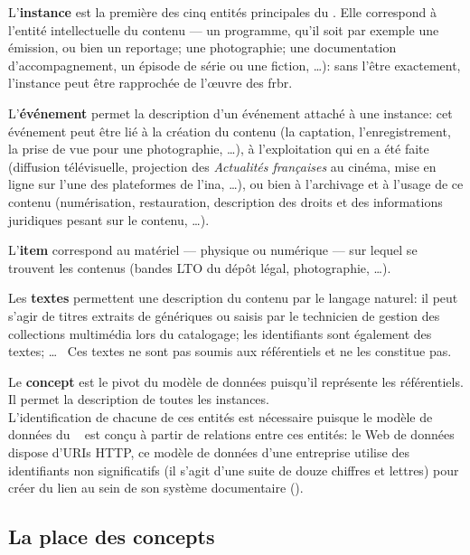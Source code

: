 \noindent L'\textbf{instance} est la première des cinq entités principales du \ldd. Elle correspond à l'entité intellectuelle du contenu --- un programme, qu'il soit par exemple une émission, ou bien un reportage; une photographie; une documentation d'accompagnement, un épisode de série ou une fiction, \dots): sans l'être exactement, l'instance peut être rapprochée de l'œuvre des \ac{frbr}.


\noindent L'\textbf{événement} permet la description d'un événement attaché à une instance: cet événement peut être lié à la création du contenu (la captation, l'enregistrement, la prise de vue pour une photographie, \dots), à l'exploitation qui en a été faite (diffusion télévisuelle, projection des \textit{Actualités françaises} au cinéma, mise en ligne sur l'une des plateformes de l'\ac{ina}, \dots), ou bien à l'archivage et à l'usage de ce contenu (numérisation, restauration, description des droits et des informations juridiques pesant sur le contenu, \dots).

\noindent L'\textbf{item} correspond au matériel --- physique ou numérique --- sur lequel se trouvent les contenus (bandes LTO du dépôt légal, photographie, \dots).

\noindent Les \textbf{textes} permettent une description du contenu par le langage naturel: il peut s'agir de titres extraits de génériques ou saisis par le technicien de gestion des collections multimédia lors du catalogage; les identifiants sont également des textes; \dots ~ Ces textes ne sont pas soumis aux référentiels et ne les constitue pas.

\noindent Le \textbf{concept} est le pivot du modèle de données puisqu'il représente les référentiels. Il permet la description de toutes les instances.\\

L'identification de chacune de ces entités est nécessaire puisque le modèle de données du \ldd~ est conçu à partir de relations entre ces entités: le Web de données dispose d'URIs HTTP, ce modèle de données d'une entreprise utilise des identifiants non significatifs (il s'agit d'une suite de douze chiffres et lettres) pour créer du lien au sein de son système documentaire ().



\subsection{\label{III-B-2-b}La place des concepts}

